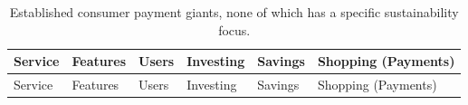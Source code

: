 \documentclass[
  12pt,
  letterpaper,
  DIV=11,
  numbers=noendperiod]{scrartcl}
\begin{document}
\begin{longtable}[]{@{}
  >{\raggedright\arraybackslash}p{}
  >{\raggedright\arraybackslash}p{}
  >{\raggedright\arraybackslash}p{}
  >{\raggedright\arraybackslash}p{}
  >{\raggedright\arraybackslash}p{}
  >{\raggedright\arraybackslash}p{}@{}}
\caption[Consumer Payment Giants]{Established consumer payment giants,
none of which has a specific sustainability focus.}\tabularnewline
\toprule\noalign{}
\begin{minipage}[b]{\linewidth}\raggedright
Service
\end{minipage} & \begin{minipage}[b]{\linewidth}\raggedright
Features
\end{minipage} & \begin{minipage}[b]{\linewidth}\raggedright
Users
\end{minipage} & \begin{minipage}[b]{\linewidth}\raggedright
Investing
\end{minipage} & \begin{minipage}[b]{\linewidth}\raggedright
Savings
\end{minipage} & \begin{minipage}[b]{\linewidth}\raggedright
Shopping (Payments)
\end{minipage} \\
\midrule\noalign{}
\endfirsthead
\toprule\noalign{}
\begin{minipage}[b]{\linewidth}\raggedright
Service
\end{minipage} & \begin{minipage}[b]{\linewidth}\raggedright
Features
\end{minipage} & \begin{minipage}[b]{\linewidth}\raggedright
Users
\end{minipage} & \begin{minipage}[b]{\linewidth}\raggedright
Investing
\end{minipage} & \begin{minipage}[b]{\linewidth}\raggedright
Savings
\end{minipage} & \begin{minipage}[b]{\linewidth}\raggedright
Shopping (Payments)
\end{minipage} \\

\end{longtable}
\end{document}
